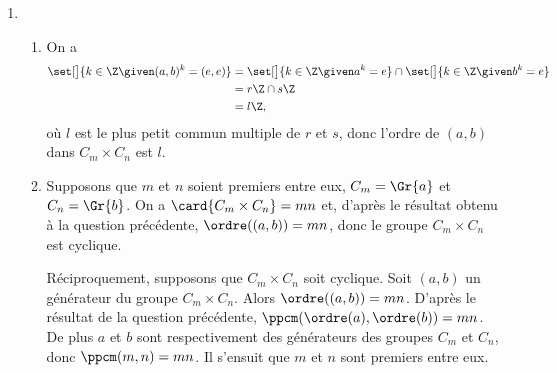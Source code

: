 \begin{enumerate}[1)]
  \item
    \begin{enumerate}
      \item
        On a
        \begin{align*}
          \set[\big]{k\in\Z \given (a,b)^k = (e,e)}
            &= \set[\big]{k\in\Z \given a^k = e} \cap \set[\big]{k\in\Z \given b^k = e} \\
            &= r\Z \cap s\Z \\
            &= l\Z,
        \end{align*}
        où $l$ est le plus petit commun multiple de $r$ et $s$, donc l'ordre de $(a,b)$ dans $C_m\times C_n$ est $l$.

      \item
        Supposons que $m$ et $n$ soient premiers entre eux,  $C_m = \Gr{a}$ et $C_n = \Gr{b}$.
        On a $\card{C_m\times C_n} = mn$ et, d'après le résultat obtenu à la question précédente, $\ordre((a,b)) = mn$, donc le groupe $C_m\times C_n$ est cyclique.

        Réciproquement, supposons que $C_m\times C_n$ soit cyclique.
        Soit $(a,b)$ un générateur du groupe $C_m\times C_n$.
        Alors $\ordre((a,b)) = mn$.
        D'après le résultat de la question précédente, $\ppcm(\ordre(a),\ordre(b)) = mn$.
        De plus $a$ et $b$ sont respectivement des générateurs des groupes $C_m$ et $C_n$, donc $\ppcm(m,n) = mn$.
        Il s'ensuit que $m$ et $n$ sont premiers entre eux.
    \end{enumerate}
\end{enumerate}
